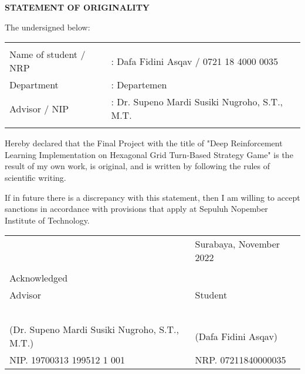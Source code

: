 \begin{center}
  \large
  \textbf{STATEMENT OF ORIGINALITY}
\end{center}

\thispagestyle{empty}

\vspace{2ex}


\noindent The undersigned below:

\noindent\begin{tabularx}{\textwidth}{X X l}
  & \\
  Name of student / NRP &: Dafa Fidini Asqav / 0721 18 4000 0035 \\
  Department &: Departemen \\
  Advisor / NIP &: Dr. Supeno Mardi Susiki Nugroho, S.T., M.T.  \\
  & \\
\end{tabularx}

Hereby declared that the Final Project with the title of "Deep Reinforcement Learning Implementation on Hexagonal Grid Turn-Based Strategy Game" is the result of my own work, is original, and is written by following the rules of scientific writing.

If in future there is a discrepancy with this statement, then I am willing to accept sanctions in accordance with provisions that apply at Sepuluh Nopember Institute of Technology.

\vspace{8ex}

\noindent\begin{tabularx}{\textwidth}{X l}
  & Surabaya, November 2022\\
  & \\
  Acknowledged & \\
  Advisor & Student\\
  & \\
  & \\
  & \\
  & \\
  & \\
  (Dr. Supeno Mardi Susiki Nugroho, S.T., M.T.) & (Dafa Fidini Asqav) \\
  NIP. 19700313 199512 1 001 & NRP. 07211840000035 \\
\end{tabularx}